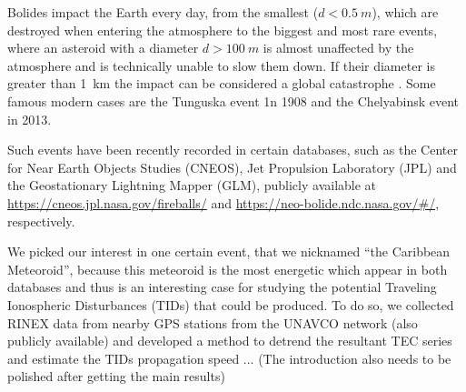 Bolides impact the Earth every day, from the smallest ($d<\SI{0.5}{m}$), which are destroyed when entering the atmosphere to the biggest and most rare events, where an asteroid with a diameter $d>\SI{100}{m}$ is almost unaffected by the atmosphere and is technically unable to slow them down. If their diameter is greater than \SI{1}{km} the impact can be considered a global catastrophe \citep{Dudorov:2020}. Some famous modern cases are the Tunguska event 1n 1908 \citep{Wheeler:2019} and the Chelyabinsk event \citep{Yang:2014} in 2013.

Such events have been recently recorded in certain databases, such as the Center for Near Earth Objects Studies (CNEOS), Jet Propulsion Laboratory (JPL) and the Geostationary Lightning Mapper (GLM), publicly available at \url{https://cneos.jpl.nasa.gov/fireballs/} and \url{https://neo-bolide.ndc.nasa.gov/#/}, respectively.

We picked our interest in one certain event, that we nicknamed ``the Caribbean Meteoroid'', because this meteoroid is the most energetic which appear in both databases and thus is an interesting case for studying the potential Traveling Ionospheric Disturbances (TIDs) that could be produced. To do so, we collected RINEX data from nearby GPS stations from the UNAVCO network (also publicly available) and developed a method to detrend the resultant TEC series and estimate the TIDs propagation speed ... (The introduction also needs to be polished after getting the main results)

